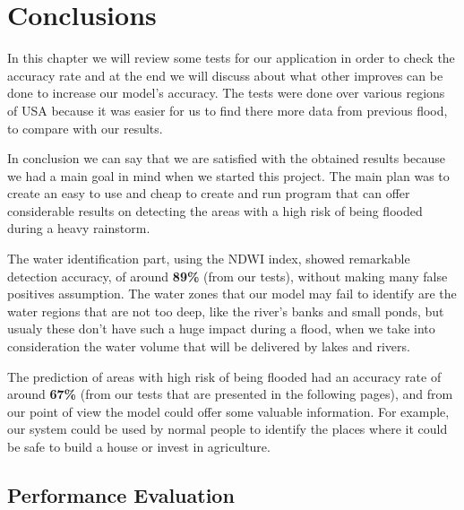 \documentclass[12pt, a4paper]{report}
\begin{document}
\newpage



\newpage{}

\chapter{Conclusions}

\quad 

In this chapter we will review some tests for our application in order to check the accuracy rate and at the end we will discuss about what other improves can be done to increase our model's accuracy. The tests were done over various regions of USA because it was easier for us to find there more data from previous flood, to compare with our results.
\par 

In conclusion we can say that we are satisfied with the obtained results because we had a main goal in mind when we started this project. The main plan was to create an easy to use and cheap to create and run program that can offer considerable results on detecting the areas with a high risk of being flooded during a heavy rainstorm.
\par 

The water identification part, using the NDWI index, showed remarkable detection accuracy, of around \textbf{89\%} (from our tests), without making many false positives assumption. The water zones that our model may fail to identify are the water regions that are not too deep, like the river's banks and small ponds, but usualy these don't have such a huge impact during a flood, when we take into consideration the water volume that will be delivered by lakes and rivers.
\par 

The prediction of areas with high risk of being flooded had an accuracy rate of around \textbf{67\%} (from our tests that are presented in the following pages), and from our point of view the model could offer some valuable information. For example, our system could be used by normal people to identify the places where it could be safe to build a house or invest in agriculture.

\newpage

\section{Performance Evaluation} 
\end{document}
